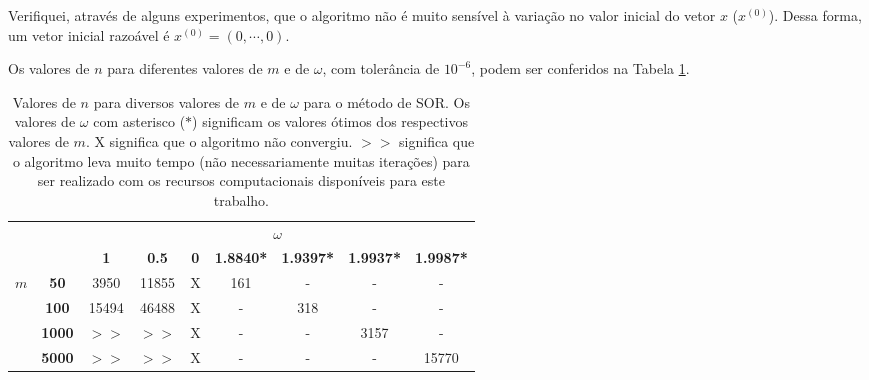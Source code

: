 \documentclass{article}
\begin{document}
\begin{enumerate}
\begin{enumerate}
                    Verifiquei, através de alguns experimentos, que o algoritmo não é muito sensível à variação no valor inicial do vetor $x$ ($x^{(0)}$).
                    Dessa forma, um vetor inicial razoável é $x^{(0)}=(0, \cdots, 0)$.

                    Os valores de $n$ para diferentes valores de $m$ e de $\omega$, com tolerância de 
                    $10^{-6}$, podem ser conferidos na Tabela \ref{tab:omega_m}.

                    \begin{table}[!h]
                        \centering
                        \begin{tabular}{cc|c|c|c|c|c|c|c|}
                            \cline{3-9}
                                                &               & \multicolumn{7}{c|}{\textbf{$\omega$}}      \\ \cline{3-9} 
                            &
                            &
                            \textbf{1} &
                            \textbf{0.5} &
                            \textbf{0} &
                            \textbf{1.8840*} &
                            \textbf{1.9397*} &
                            \textbf{1.9937*} &
                            \textbf{1.9987*} \\ \hline
                            \multicolumn{1}{|c|}{\multirow{4}{*}{\textbf{$m$}}} &
                            \textbf{50} &
                            3950 &
                            11855 &
                            X &
                            161 &
                            - &
                            - &
                            - \\ \cline{2-9} 
                            \multicolumn{1}{|c|}{} & \textbf{100}  & 15494 & 46488 & X & - & 318 & -    & -     \\ \cline{2-9} 
                            \multicolumn{1}{|c|}{} & \textbf{1000} & $>>$ & $>>$ & X & - & -   & 3157 & -     \\ \cline{2-9} 
                            \multicolumn{1}{|c|}{} & \textbf{5000} & $>>$ & $>>$ & X & - & -   & -    & 15770 \\ \hline
                        \end{tabular}
                        \caption{Valores de $n$ para diversos valores de $m$ e de $\omega$ para o método de SOR. Os valores de $\omega$ com asterisco ($*$)
                        significam os valores ótimos dos respectivos valores de $m$. X significa que o algoritmo não convergiu. $>>$ significa que o algoritmo
                        leva muito tempo (não necessariamente muitas iterações) para ser realizado com os recursos computacionais disponíveis para este trabalho.}
                        \label{tab:omega_m}
                    \end{table}


\end{enumerate}
\end{enumerate}
\end{document}
